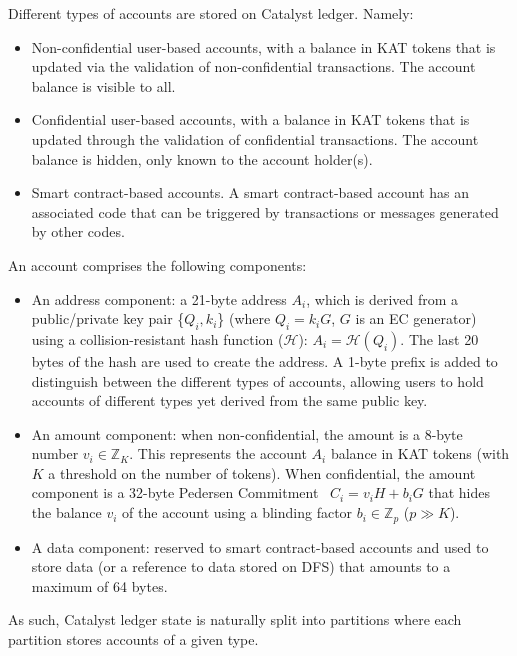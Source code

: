 Different types of accounts are stored on Catalyst ledger. Namely:

\begin{itemize}
\item Non-confidential user-based accounts, with a balance in KAT tokens that is updated via the validation of non-confidential transactions. The account balance is visible to all.
\item Confidential user-based accounts, with a balance in KAT tokens that is updated through the validation of confidential transactions. The account balance is hidden, only known to the account holder(s).
\item Smart contract-based accounts. A smart contract-based account has an associated code that can be triggered by transactions or messages generated by other codes.
\end{itemize}

An account comprises the following components: 

\begin{itemize}
\item An address component: a 21-byte address $A_{i}$, which is derived from a public/private key pair \{$Q_{i},k_{i}$\} (where $Q_i= k_{i}G$, $G$ is an EC generator) using a collision-resistant hash function ($\mathcal{H}$): $A_{i} = \mathcal{H}(Q_{i})$. The last 20 bytes of the hash are used to create the address. A 1-byte prefix is added to distinguish between the different types of accounts, allowing users to hold accounts of different types yet derived from the same public key. 
\item An amount component: when non-confidential, the amount is a 8-byte number $v_{i} \in \mathbb{Z}_K$. This represents the account $A_{i}$ balance in KAT tokens (with $K$ a threshold on the number of tokens). When confidential, the amount component is a 32-byte Pedersen Commitment~\cite{confidential} $C_{i} = v_{i}H + b_{i}G$ that hides the balance $v_i$ of the account using a blinding factor $b_{i} \in \mathbb{Z}_p$ ($p \gg K$).
\item A data component: reserved to smart contract-based accounts and used to store data (or a reference to data stored on DFS) that amounts to a maximum of 64 bytes. 
\end{itemize}

As such, Catalyst ledger state is naturally split into partitions where each partition stores accounts of a given type.
